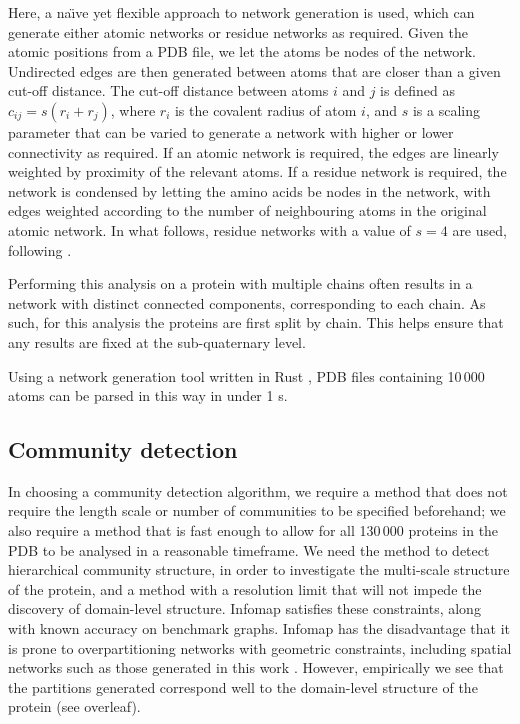 \documentclass[a4paper,numbib, final, twoside, titelpage]{imaiai}%
\begin{document}
Here, a na\"{\i}ve yet flexible approach to network generation is used, which can generate either atomic networks or residue networks as required. Given the atomic positions from a PDB file, we let the atoms be nodes of the network. Undirected edges are then generated between atoms that are closer than a given cut-off distance. The cut-off distance between atoms $i$ and $j$ is defined as $c_{ij} = s \left( r_{i} + r_{j} \right)$, where $r_i$ is the covalent radius of atom $i$, and $s$ is a scaling parameter that can be varied to generate a network with higher or lower connectivity as required. If an atomic network is required, the edges are linearly weighted by proximity of the relevant atoms. If a residue network is required, the network is condensed by letting the amino acids be nodes in the network, with edges weighted according to the number of neighbouring atoms in the original atomic network. In what follows, residue networks with a value of $s=4$ are used, following \cite{Yan14}.

Performing this analysis on a protein with multiple chains often results in a network with distinct connected components, corresponding to each chain. As such, for this analysis the proteins are first split by chain. This helps ensure that any results are fixed at the sub-quaternary level.

Using a network generation tool written in Rust \cite{Matsakis14}, PDB files containing 10\,000 atoms can be parsed in this way in under 1 s.

\subsection{Community detection}

In choosing a community detection algorithm, we require a method that does not require the length scale or number of communities to be specified beforehand; we also require a method that is fast enough to allow for all 130\,000 proteins in the PDB to be analysed in a reasonable timeframe. We need the method to detect hierarchical community structure, in order to investigate the multi-scale structure of the protein, and a method with a resolution limit that will not impede the discovery of domain-level structure. Infomap \cite{Rosvall11} satisfies these constraints, along with known accuracy on benchmark graphs. Infomap has the disadvantage that it is prone to overpartitioning networks with geometric constraints, including spatial networks such as those generated in this work \cite{Schaub12}. However, empirically we see that the partitions generated correspond well to the domain-level structure of the protein (see overleaf).
\end{document}
